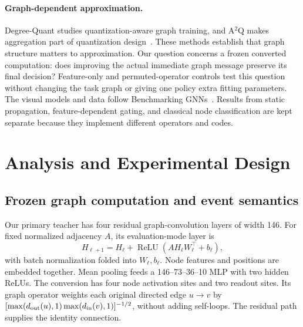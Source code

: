 \documentclass[10pt,twocolumn,letterpaper]{article}
\begin{document}
\paragraph{Graph-dependent approximation.}
Degree-Quant studies quantization-aware graph training, and A$^2$Q makes aggregation part of quantization design~\cite{degreequant2021,a2q2023}. These methods establish that graph structure matters to approximation. Our question concerns a frozen converted computation: does improving the actual immediate graph message preserve its final decision? Feature-only and permuted-operator controls test this question without changing the task graph or giving one policy extra fitting parameters. The visual models and data follow Benchmarking GNNs~\cite{dwivedi2023}. Results from static propagation, feature-dependent gating, and classical node classification are kept separate because they implement different operators and codes.

\section{Analysis and Experimental Design}
\subsection{Frozen graph computation and event semantics}
Our primary teacher has four residual graph-convolution layers of width 146. For fixed normalized adjacency $A$, its evaluation-mode layer is
\begin{equation}
 H_{\ell+1}=H_\ell+\operatorname{ReLU}(AH_\ell W_\ell^\top+b_\ell),
 \label{eq:block}
\end{equation}
with batch normalization folded into $W_\ell,b_\ell$. Node features and positions are embedded together. Mean pooling feeds a 146--73--36--10 MLP with two hidden ReLUs. The conversion has four node activation sites and two readout sites. Its graph operator weights each original directed edge $u\!\to\!v$ by $[\max(d_{\rm out}(u),1)\max(d_{\rm in}(v),1)]^{-1/2}$, without adding self-loops. The residual path supplies the identity connection.
\end{document}

